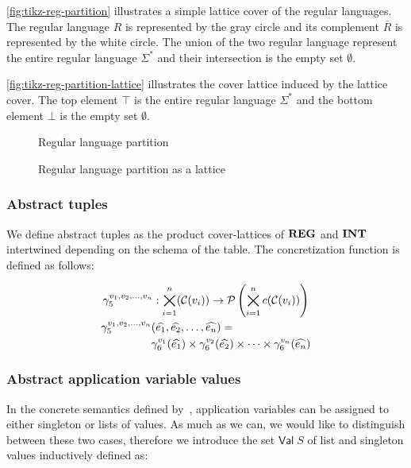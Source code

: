 \begin{example}
    \autoref{fig:tikz-reg-partition} illustrates a simple lattice cover of the regular languages.
    The regular language $R$ is represented by the gray circle and its complement $\overline{R}$ is represented by the white circle.
    The union of the two regular language represent the entire regular language $\Sigma^*$ and their intersection is the empty set $\emptyset$.

    \autoref{fig:tikz-reg-partition-lattice} illustrates the cover lattice induced by the lattice cover.
    The top element $\top$ is the entire regular language $\Sigma^*$ and the bottom element $\bot$ is the empty set $\emptyset$.
\end{example}

\begin{figure}
    \center
    
    \caption{Regular language partition}
    \label{fig:tikz-reg-partition}
\end{figure}

\begin{figure}[!htb]
    \center
    
    \caption{Regular language partition as a lattice}
    \label{fig:tikz-reg-partition-lattice}
\end{figure}

\subsubsection{Abstract tuples}\label{subsubsec:abstract-tuples}

We define abstract tuples as the product cover-lattices of $\mathbf{REG}$ and $\mathbf{INT}$ intertwined depending on the schema of the table.
The concretization function is defined as follows:


\begin{gather}
    \gamma^{v_1, v_2, \dots, v_n}_5 : \bigtimes_{i = 1}^{n}(\mathcal{C}(v_i)) \rightarrow \mathcal{P}\left(\bigtimes_{i = 1}^n c(\mathcal{C}(v_i)) \right)\\
    \begin{split}
        \gamma^{v_1, v_2, \dots, v_n}_5 & (\widehat{e_1}, \widehat{e_2}, \dots, \widehat{e_n}) = \\
         &\gamma^{v_1}_6(\widehat{e_1}) \times \gamma^{v_2}_6(\widehat{e_2}) \times \dots \times \gamma^{v_n}_6(\widehat{e_n})
    \end{split}
\end{gather}

\subsubsection{Abstract application variable values}
In the concrete semantics defined by~\cite{halder_abstract_2012}, application variables can be assigned to either singleton or lists of values.
As much as we can, we would like to distinguish between these two cases, therefore we introduce the set $\mathsf{Val} \; S$ of list and singleton values inductively defined as:



